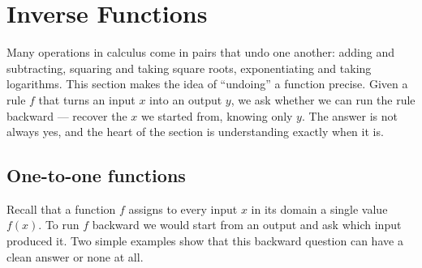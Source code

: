 
\section{Inverse Functions}\label{sec:inverse-functions}

Many operations in calculus come in pairs that undo one another: adding and subtracting, squaring and taking square roots, exponentiating and taking logarithms. This section makes the idea of ``undoing'' a function precise. Given a rule \(f\) that turns an input \(x\) into an output \(y\), we ask whether we can run the rule backward --- recover the \(x\) we started from, knowing only \(y\). The answer is not always yes, and the heart of the section is understanding exactly when it is.

\subsection{One-to-one functions}

Recall that a function \(f\) assigns to every input \(x\) in its domain a single value \(f(x)\). To run \(f\) backward we would start from an output and ask which input produced it. Two simple examples show that this backward question can have a clean answer or none at all.

